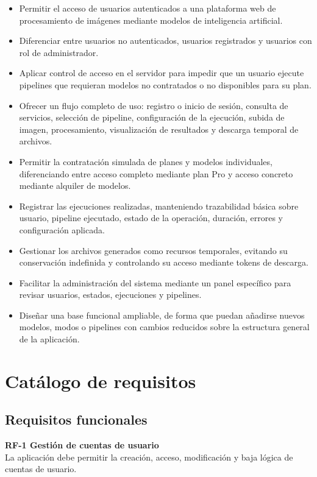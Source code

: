 \begin{itemize}
	\item Permitir el acceso de usuarios autenticados a una plataforma web de procesamiento de imágenes mediante modelos de inteligencia artificial.
	\item Diferenciar entre usuarios no autenticados, usuarios registrados y usuarios con rol de administrador.
	\item Aplicar control de acceso en el servidor para impedir que un usuario ejecute pipelines que requieran modelos no contratados o no disponibles para su plan.
	\item Ofrecer un flujo completo de uso: registro o inicio de sesión, consulta de servicios, selección de pipeline, configuración de la ejecución, subida de imagen, procesamiento, visualización de resultados y descarga temporal de archivos.
	\item Permitir la contratación simulada de planes y modelos individuales, diferenciando entre acceso completo mediante plan Pro y acceso concreto mediante alquiler de modelos.
	\item Registrar las ejecuciones realizadas, manteniendo trazabilidad básica sobre usuario, pipeline ejecutado, estado de la operación, duración, errores y configuración aplicada.
	\item Gestionar los archivos generados como recursos temporales, evitando su conservación indefinida y controlando su acceso mediante tokens de descarga.
	\item Facilitar la administración del sistema mediante un panel específico para revisar usuarios, estados, ejecuciones y pipelines.
	\item Diseñar una base funcional ampliable, de forma que puedan añadirse nuevos modelos, modos o pipelines con cambios reducidos sobre la estructura general de la aplicación.
\end{itemize}

\section{Catálogo de requisitos}

\subsection{Requisitos funcionales}

\textbf{RF-1 Gestión de cuentas de usuario}\\
La aplicación debe permitir la creación, acceso, modificación y baja lógica de cuentas de usuario.

